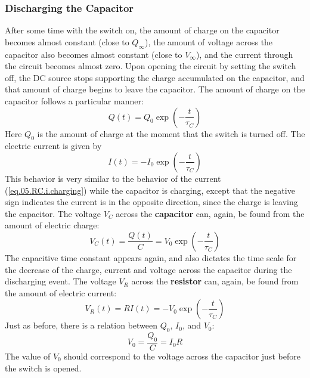 \subsubsection{Discharging the Capacitor}
After some time with the switch on, the amount of charge on the capacitor becomes almost constant (close to $Q_{\infty}$), the amount of voltage across the capacitor also becomes almost constant (close to $V_{\infty}$), and the current through the circuit becomes almost zero. Upon opening the circuit by setting the switch off, the DC source stops supporting the charge accumulated on the capacitor, and that amount of charge begins to leave the capacitor. The amount of charge on the capacitor follows a particular manner:
\begin{equation}
    Q(t) = Q_{0} \exp\left(-\frac{t}{\tau_{C}}\right)
    \label{eq.05.RC.q.discharging}
\end{equation}
Here $Q_{0}$ is the amount of charge at the moment that the switch is turned off. The electric current is given by
\begin{equation}
    I(t) = - I_{0} \exp\left(-\frac{t}{\tau_{C}}\right)
    \label{eq.05.RC.i.discharging}
\end{equation}
This behavior is very similar to the behavior of the current (\ref{eq.05.RC.i.charging}) while the capacitor is charging, except that the negative sign indicates the current is in the opposite direction, since the charge is leaving the capacitor. The voltage $V_{C}$ across the \textbf{capacitor} can, again, be found from the amount of electric charge:
\begin{equation}
    V_{C}(t) = \frac{Q(t)}{C} = V_{0} \exp\left(-\frac{t}{\tau_{C}}\right)
    \label{eq.05.RC.vC.discharging}
\end{equation}
The capacitive time constant appears again, and also dictates the time scale for the decrease of the charge, current and voltage across the capacitor during the discharging event. The voltage $V_{R}$ across the \textbf{resistor} can, again, be found from the amount of electric current:
\begin{equation}
    V_{R}(t) = R I(t) = - V_{0} \exp\left(-\frac{t}{\tau_{C}}\right)
\end{equation}
Just as before, there is a relation between $Q_{0}$, $I_{0}$, and $V_{0}$:
\begin{equation}
    V_{0} = \frac{Q_{0}}{C} = I_{0} R
\end{equation}
The value of $V_{0}$ should correspond to the voltage across the capacitor just before the switch is opened.
